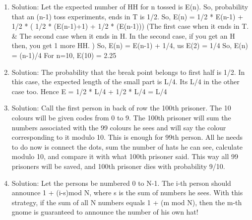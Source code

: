 \begin{enumerate}
\item
Solution: Let the expected number of HH for n tossed is E(n). So, probability that an (n-1) toss experiments, ends in T is 1/2.
So, E(n) = 1/2 * E(n-1) + 1/2 * ( 1/2 * (E(n-1)+1) + 1/2 * (E(n-1)))
(The first case when it ends in T. \& The second case when it ends in H.
In the second case, if you get an H then, you get 1 more HH. )
So, E(n) = E(n-1) + 1/4, us E(2) = 1/4
So, E(n) = (n-1)/4
For n=10, E(10) = 2.25




\item
Solution: The probability that the break point belongs to first half is 1/2. In this case, the expected length of the small part is L/4. Its L/4 in the other case too. Hence E = 1/2 * L/4 + 1/2 * L/4 = L/4




\item
Solution: Call the first person in back of row the 100th prisoner. The 10 colours will be given codes from 0 to 9. The 100th prisoner will sum the numbers associated with the 99 colours he sees and will say the colour corresponding to it modulo 10. This is enough for 99th person. All he needs to do now is connect the dots, sum the number of hats he can see, calculate modulo 10, and compare it with what 100th prisoner said. This way all 99 prisoners will be saved, and 100th prisoner dies with probability 9/10.




\item
Solution: Let the persons be numbered 0 to N-1. The i-th person should announce 1 + (i-s)mod N, where s is the sum of numbers he sees. With this strategy, if the sum of all N numbers equals 1 + (m mod N), then the m-th gnome is guaranteed to announce the number of his own hat!





\end{enumerate}
